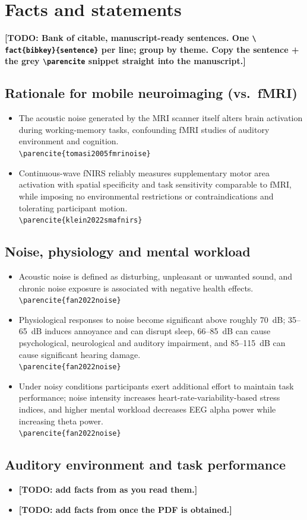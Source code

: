 \documentclass[11pt,a4paper]{article}
\newcommand{\todo}[1]{\textcolor{blue!60!black}{\textbf{[TODO: #1]}}}
\newcommand{\fact}[2]{%
  \item #2~\parencite{#1}
    \\[-2pt]{\footnotesize\color{gray}\texttt{\textbackslash parencite\{#1\}}}%
}
\begin{document}
\section{Facts and statements}
\label{sec:facts}
\todo{Bank of citable, manuscript-ready sentences. One \texttt{\textbackslash
fact\{bibkey\}\{sentence\}} per line; group by theme. Copy the sentence + the
grey \texttt{\textbackslash parencite} snippet straight into the manuscript.}

\subsection{Rationale for mobile neuroimaging (vs.\ fMRI)}
\begin{itemize}[leftmargin=1.4em]
  \fact{tomasi2005fmrinoise}{The acoustic noise generated by the MRI scanner
  itself alters brain activation during working-memory tasks, confounding fMRI
  studies of auditory environment and cognition.}
  \fact{klein2022smafnirs}{Continuous-wave fNIRS reliably measures
  supplementary motor area activation with spatial specificity and task
  sensitivity comparable to fMRI, while imposing no environmental restrictions
  or contraindications and tolerating participant motion.}
\end{itemize}

\subsection{Noise, physiology and mental workload}
\begin{itemize}[leftmargin=1.4em]
  \fact{fan2022noise}{Acoustic noise is defined as disturbing, unpleasant or
  unwanted sound, and chronic noise exposure is associated with negative health
  effects.}
  \fact{fan2022noise}{Physiological responses to noise become significant above
  roughly 70~dB; 35--65~dB induces annoyance and can disrupt sleep, 66--85~dB
  can cause psychological, neurological and auditory impairment, and 85--115~dB
  can cause significant hearing damage.}
  \fact{fan2022noise}{Under noisy conditions participants exert additional
  effort to maintain task performance; noise intensity increases
  heart-rate-variability-based stress indices, and higher mental workload
  decreases EEG alpha power while increasing theta power.}
\end{itemize}

\subsection{Auditory environment and task performance}
\begin{itemize}[leftmargin=1.4em]
  \item \todo{add facts from
  \parencite{hiwa2018fnirs,gabbard2017fnirs,yun2025anc,pieper2021noise} as you
  read them.}
  \item \todo{add facts from \parencite{dryden2017speechinnoise} once the PDF is
  obtained.}
\end{itemize}
\end{document}
